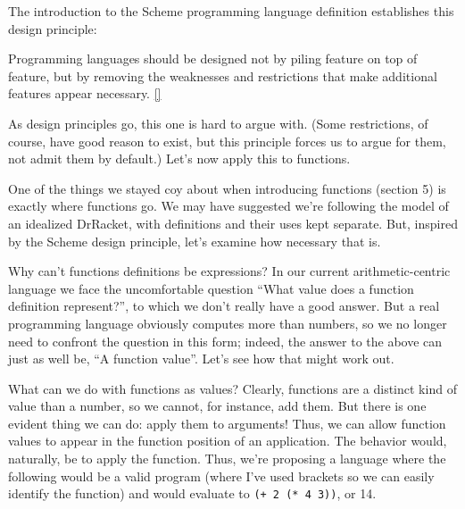 \secdown

The introduction to the Scheme programming language definition establishes this
design principle:
\begin{framed}
Programming languages should be designed not by piling feature on top of
feature, but by removing the weaknesses and restrictions that make additional
features appear necessary. \ref{}
\end{framed}
As design principles go, this one is hard to argue with. (Some restrictions, of
course, have good reason to exist, but this principle forces us to argue for
them, not admit them by default.) Let’s now apply this to functions.

One of the things we stayed coy about when introducing functions (section 5) is
exactly where functions go. We may have suggested we’re following the model of
an idealized DrRacket, with definitions and their uses kept separate. But,
inspired by the Scheme design principle, let’s examine how necessary that is.

Why can’t functions definitions be expressions? In our current
arithmetic-centric language we face the uncomfortable question “What value does
a function definition represent?”, to which we don’t really have a good answer.
But a real programming language obviously computes more than numbers, so we no
longer need to confront the question in this form; indeed, the answer to the
above can just as well be, “A function value”. Let’s see how that might work
out.

What can we do with functions as values? Clearly, functions are a distinct kind
of value than a number, so we cannot, for instance, add them. But there is one
evident thing we can do: apply them to arguments! Thus, we can allow function
values to appear in the function position of an application. The behavior would,
naturally, be to apply the function. Thus, we’re proposing a language where the
following would be a valid program (where I’ve used brackets so we can easily
identify the function)
and would evaluate to \verb|(+ 2 (* 4 3))|, or 14.






\secup
